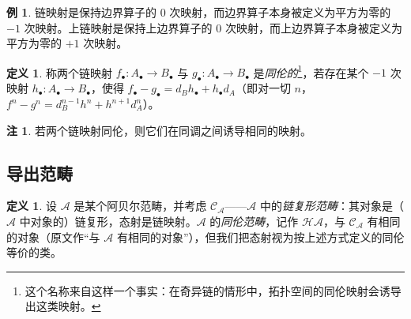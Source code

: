 \documentclass[11pt,a4paper]{article}
\theoremstyle{plain}
\theoremstyle{definition}
\newtheorem{definition}[theorem]{定义}
\newtheorem{remark}[theorem]{注}
\newtheorem*{example}{例}
\begin{document}
\begin{example}
链映射是保持边界算子的 $0$ 次映射，而边界算子本身被定义为平方为零的 $-1$ 次映射。上链映射是保持上边界算子的 $0$ 次映射，而上边界算子本身被定义为平方为零的 $+1$ 次映射。
\end{example}

\begin{definition}
称两个链映射 $f_\bullet:A_\bullet\to B_\bullet$ 与 $g_\bullet:A_\bullet\to B_\bullet$ 是\emph{同伦的}\footnote{这个名称来自这样一个事实：在奇异链的情形中，拓扑空间的同伦映射会诱导出这类映射。}，若存在某个 $-1$ 次映射 $h_\bullet:A_\bullet\to B_\bullet$，使得 $f_\bullet-g_\bullet=d_Bh_\bullet+h_\bullet d_A$（即对一切 $n$，$f^n-g^n=d_B^{n-1}h^n+h^{n+1}d_A^n$）。
\end{definition}

\begin{remark}
若两个链映射同伦，则它们在同调之间诱导相同的映射。
\end{remark}

\subsection{导出范畴}

\begin{definition}
设 $\mathcal{A}$ 是某个阿贝尔范畴，并考虑 $\mathcal{C}_{\mathcal{A}}$——$\mathcal{A}$ 中的\emph{链复形范畴}：其对象是（$\mathcal{A}$ 中对象的）链复形，态射是链映射。$\mathcal{A}$ 的\emph{同伦范畴}，记作 $\mathcal{H}\mathcal{A}$，与 $\mathcal{C}_{\mathcal{A}}$ 有相同的对象（原文作“与 $\mathcal{A}$ 有相同的对象”），但我们把态射视为按上述方式定义的同伦等价的类。
\end{definition}
\end{document}
